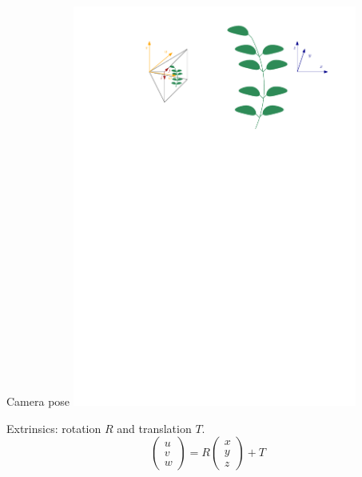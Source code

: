 \documentclass[aspectratio=169]{beamer}
\begin{document}
\begin{frame}{Camera pose}
    \centering
    \includegraphics[width=0.7\textwidth]{images/reperes.pdf}

    Extrinsics: rotation $R$ and translation $T$.
    $$\left( \begin{array}{c}
    u \\ v \\ w
    \end{array} \right)= R\left( \begin{array}{c}
    x \\ y \\ z
    \end{array} \right) + T$$
\end{frame}
\end{document}
